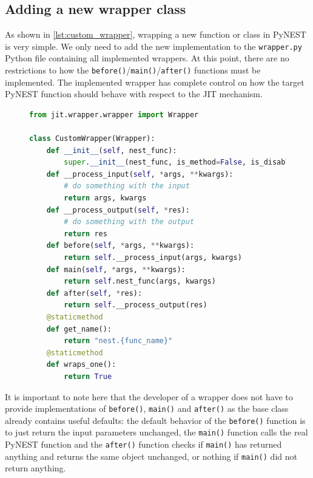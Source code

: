 \subsection{Adding a new wrapper class}

As shown in \autoref{lst:custom_wrapper}, wrapping a new function or class in PyNEST is very simple. We only need to add the new implementation to the \texttt{wrapper.py} Python file containing all implemented wrappers. At this point, there are no restrictions to how the \texttt{before()}/\texttt{main()}/\texttt{after()} functions must be implemented. The implemented wrapper has complete control on how the target PyNEST function should behave with respect to the JIT mechanism.

\begin{figure}[ht!]
\centering
 \begin{lstlisting}[language=Python, label=lst:custom_wrapper, caption={CustomWrapper example}]
from jit.wrapper.wrapper import Wrapper

class CustomWrapper(Wrapper):
    def __init__(self, nest_func):
        super.__init__(nest_func, is_method=False, is_disabled=False)
    def __process_input(self, *args, **kwargs):
        # do something with the input
        return args, kwargs
    def __process_output(self, *res):
        # do something with the output
        return res
    def before(self, *args, **kwargs):
        return self.__process_input(args, kwargs)
    def main(self, *args, **kwargs):
        return self.nest_func(args, kwargs)
    def after(self, *res):
        return self.__process_output(res)
    @staticmethod
    def get_name():
        return "nest.{func_name}"
    @staticmethod
    def wraps_one():
        return True
\end{lstlisting}
\end{figure}


It is important to note here that the developer of a wrapper does not have to provide implementations of \texttt{before()}, \texttt{main()} and \texttt{after()} as the base class already contains useful defaults: the default behavior of the \texttt{before()} function is to just return the input parameters unchanged, the \texttt{main()} function calls the real PyNEST function and the \texttt{after()} function checks if \texttt{main()} has returned anything and returns the same object unchanged, or nothing if \texttt{main()} did not return anything.

